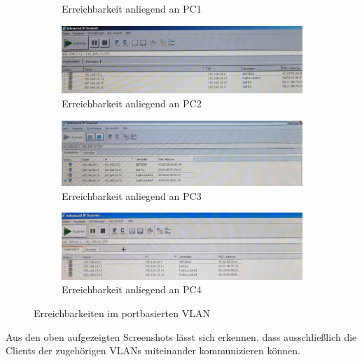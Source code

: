 \begin{figure}[H]
\begin{subfigure}{.45\linewidth}
                \caption{Erreichbarkeit anliegend an PC1}
            \end{subfigure}
            \begin{subfigure}{\textwidth}
                \centering
                \includegraphics[width=\linewidth]{images/Trennung durch VLAN herstellen/ErreichbarkeitAnliegendAn13.jpg}
                \caption{Erreichbarkeit anliegend an PC2}
            \end{subfigure}
            \begin{subfigure}{\textwidth}
                \centering
                \includegraphics[width=\linewidth]{images/Trennung durch VLAN herstellen/ErreichbarkeitAnliegendAn14.jpg}
                \caption{Erreichbarkeit anliegend an PC3}
            \end{subfigure}
            \begin{subfigure}{\textwidth}
                \centering
                \includegraphics[width=\linewidth]{images/Trennung durch VLAN herstellen/ErreichbarkeitAnliegendAn15.jpg}
                \caption{Erreichbarkeit anliegend an PC4}
            \end{subfigure}
        \caption{Erreichbarkeiten im portbasierten VLAN}
        \end{figure}
        Aus den oben aufgezeigten Screenshots lässt sich erkennen, dass ausschließlich die Clients der 
        zugehörigen VLANs miteinander kommunizieren können.



